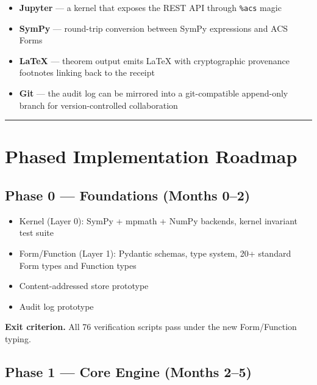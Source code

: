 \documentclass[11pt,a4paper]{article}
\providecommand{\tightlist}{\setlength{\itemsep}{0pt}\setlength{\parskip}{0pt}}
\begin{document}
\begin{itemize}
\tightlist
\item
  \textbf{Jupyter} --- a kernel that exposes the REST API through
  \texttt{\%acs} magic
\item
  \textbf{SymPy} --- round-trip conversion between SymPy expressions and
  ACS Forms
\item
  \textbf{LaTeX} --- theorem output emits LaTeX with cryptographic
  provenance footnotes linking back to the receipt
\item
  \textbf{Git} --- the audit log can be mirrored into a git-compatible
  append-only branch for version-controlled collaboration
\end{itemize}

\begin{center}\rule{0.5\linewidth}{0.5pt}\end{center}

\hypertarget{phased-implementation-roadmap}{%
\section{Phased Implementation
Roadmap}\label{phased-implementation-roadmap}}

\hypertarget{phase-0-foundations-months-02}{%
\subsection{Phase 0 --- Foundations (Months
0--2)}\label{phase-0-foundations-months-02}}

\begin{itemize}
\tightlist
\item
  Kernel (Layer 0): SymPy + mpmath + NumPy backends, kernel invariant
  test suite
\item
  Form/Function (Layer 1): Pydantic schemas, type system, 20+ standard
  Form types and Function types
\item
  Content-addressed store prototype
\item
  Audit log prototype
\end{itemize}

\textbf{Exit criterion.} All 76 verification scripts pass under the new
Form/Function typing.

\hypertarget{phase-1-core-engine-months-25}{%
\subsection{Phase 1 --- Core Engine (Months
2--5)}\label{phase-1-core-engine-months-25}}
\end{document}
